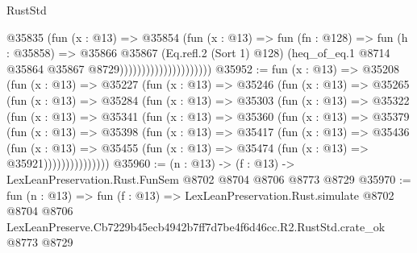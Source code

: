 \begin{lexlean}{RustStd}
\begin{coremodule}
                                      @35835
                                        (fun (x : @13) =>
                                        @35854
                                          (fun (x : @13) =>
                                          fun (fn : @128) =>
                                          fun (h : @35858) =>
                                          @35866
                                            @35867
                                            (Eq.refl.{2} (Sort 1) @128)
                                            (heq_of_eq.{1}
                                              @8714
                                              @35864
                                              @35867
                                              @8729)))))))))))))))))))))
@35952 := fun (x : @13) =>
  @35208
    (fun (x : @13) =>
    @35227
      (fun (x : @13) =>
      @35246
        (fun (x : @13) =>
        @35265
          (fun (x : @13) =>
          @35284
            (fun (x : @13) =>
            @35303
              (fun (x : @13) =>
              @35322
                (fun (x : @13) =>
                @35341
                  (fun (x : @13) =>
                  @35360
                    (fun (x : @13) =>
                    @35379
                      (fun (x : @13) =>
                      @35398
                        (fun (x : @13) =>
                        @35417
                          (fun (x : @13) =>
                          @35436
                            (fun (x : @13) =>
                            @35455 (fun (x : @13) => @35474 (fun (x : @13) => @35921)))))))))))))))
@35960 := (n : @13) -> (f : @13) -> LexLeanPreservation.Rust.FunSem @8702 @8704 @8706 @8773 @8729
@35970 := fun (n : @13) =>
  fun (f : @13) =>
  LexLeanPreservation.Rust.simulate
    @8702
    @8704
    @8706
    LexLeanPreserve.Cb7229b45ecb4942b7ff7d7be4f6d46cc.R2.RustStd.crate_ok
    @8773
    @8729
\end{coremodule}
\end{lexlean}
